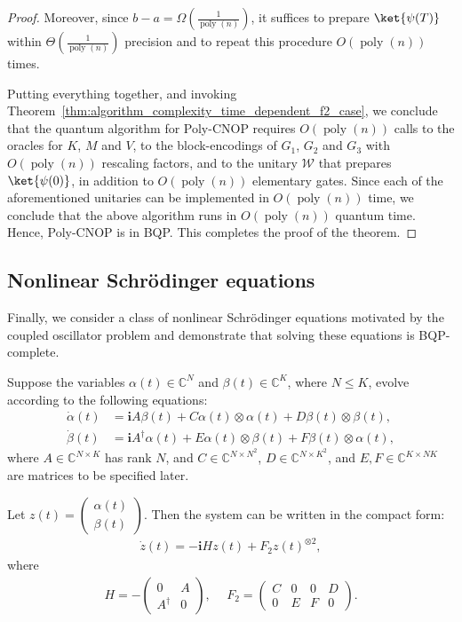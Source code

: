 \documentclass[superscriptaddress,onecolumn,nofootinbib,longbibliography,a4paper,accepted=2026-09-29]{quantumarticle}
\theoremstyle{plain}
\theoremstyle{definition}
\numberwithin{thm}{section}
\numberwithin{assumption}{section}
\numberwithin{lemma}{section}
\numberwithin{prop}{section}
\numberwithin{cor}{section}
\numberwithin{definition}{section}
\numberwithin{rmk}{section}
\numberwithin{equation}{section}
\newcommand{\lrb}[1]{\left ( #1 \right )}
\renewcommand{\i}{\ensuremath{\mathbf{i}}}
\newcommand{\mypoly}[1]{\operatorname{poly} \lrb{#1}}
\newcommand{\myO}[1]{O\lrb{#1}}
\newcommand{\myOmega}[1]{\Omega\lrb{#1}}
\newcommand{\myTheta}[1]{\Theta\lrb{#1}}
\begin{document}
\begin{proof}
Moreover, since $b-a=\myOmega{\frac{1}{\mypoly{n}}}$, it suffices to prepare $\ket{\psi(T)}$ within $\myTheta{\frac{1}{\mypoly{n}}}$ precision and to repeat this procedure $\myO{\mypoly{n}}$ times. 

Putting everything together, and invoking Theorem~\ref{thm:algorithm_complexity_time_dependent_f2_case}, we conclude that the quantum algorithm for Poly-CNOP requires $\myO{\mypoly{n}}$ calls to the oracles for $K$, $M$ and $V$, to the block-encodings of $G_1$, $G_2$ and $G_3$ with $\myO{\mypoly{n}}$ rescaling factors, and to the unitary $\mathcal{W}$ that prepares $\ket{\psi(0)}$, in addition to $\myO{\mypoly{n}}$ elementary gates. Since each of the aforementioned unitaries can be implemented in $\myO{\mypoly{n}}$ time, we conclude that the above algorithm runs in $\myO{\mypoly{n}}$ quantum time. Hence, Poly-CNOP is in BQP. This completes the proof of the theorem.
\end{proof}



\subsection{Nonlinear Schr\"{o}dinger equations}
\label{subsec:nonlinear_schrodinger_equations}

Finally, we consider a class of nonlinear Schr\"{o}dinger equations motivated by the coupled oscillator problem and demonstrate that solving these equations is BQP-complete.

Suppose the variables $\alpha(t) \in \mathbb{C}^N$ and $\beta(t) \in \mathbb{C}^K$, where $N \le K$,  evolve according to the following equations: 
\begin{align}
    \dot{\alpha}(t)&=\i A \beta(t) + C\alpha(t)\otimes \alpha(t) 
    +
    D\beta(t)\otimes \beta(t), \\ 
    \dot{\beta}(t)&=\i A^\dagger \alpha(t) + E\alpha(t) \otimes \beta(t) +
    F\beta(t) \otimes \alpha(t),  
\end{align}
where $A\in \mathbb{C}^{N \times K}$ has rank $N$, and  $C \in \mathbb{C}^{N \times N^2}$, $D \in \mathbb{C}^{N \times K^2}$, and $E, F \in \mathbb{C}^{K \times NK}$ are matrices to be specified later.

Let $z(t)=\begin{pmatrix}
    \alpha(t) \\
    \beta(t)
\end{pmatrix}$. Then the system can be written in the compact form:
\begin{align}
\dot{z}(t) = -\i H z(t) + F_2 z(t)^{\otimes 2},    
\label{eq:quadratic_nonlinear_schrodinger_equation}
\end{align}
where
\begin{align}
H = -\begin{pmatrix}
0 & A \\
A^{\dagger} & 0
\end{pmatrix},~&~
F_2=\begin{pmatrix}
    C & 0 & 0 & D \\
    0 & E & F & 0
\end{pmatrix}.    
\end{align}
\end{document}
